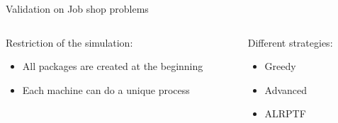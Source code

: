 \begin{frame}{Validation on Job shop problems}
\centering
\begin{columns}
    \begin{column}{0.5\textwidth}
        Restriction of the simulation:
        \begin{itemize}
            \item All packages are created at the beginning
            \item Each machine can do a unique process
        \end{itemize}
    \end{column}
    \begin{column}{0.5\textwidth}
        Different strategies:
        \begin{itemize}
            \item Greedy
            \item Advanced
            \item ALRPTF
        \end{itemize}
    \end{column}
\end{columns}
\end{frame}

\newcommand{\calcrowmean}{
    \def \rowmean{0}
    \pgfmathparse{\pgfkeysvalueof{/pgfplots/table/summary statistics/end index}-\pgfkeysvalueof{/pgfplots/table/summary statistics/start index}+1}
    \edef\numberofcols{\pgfmathresult}
    \pgfplotsforeachungrouped \col in {1,2,3,4,5,6,7,8,9,10}%
    {
        
        \typeout{col = \col}
        
        \pgfmathparse{\rowmean+\thisrowno{\col}/\numberofcols}
        \edef \rowmean{\pgfmathresult}
    }
}
\newcommand{\calcstddev}{
    \def\rowstddev{0}
    \calcrowmean
    \pgfplotsforeachungrouped \col in {1,2,3,4,5,6,7,8,9,10}
    {
        \pgfmathparse{\rowstddev+(\thisrowno{\col}-\rowmean)^2/(\numberofcols-1)}
        \edef\rowstddev{\pgfmathresult}
    }
    \pgfmathparse{sqrt(\rowstddev)}
}
\newcommand{\calcstderror}{
    \calcrowmean
    \calcstddev
    \pgfmathparse{sqrt(\rowstddev)/sqrt(\numberofcols)}
}

